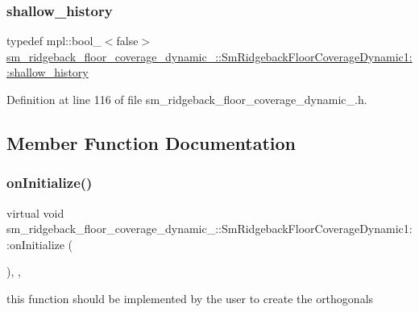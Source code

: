 \subsubsection{\texorpdfstring{shallow\+\_\+history}{shallow\_history}}
{\footnotesize\ttfamily typedef mpl\+::bool\+\_\+$<$false$>$ \hyperlink{structsm__ridgeback__floor__coverage__dynamic__1_1_1SmRidgebackFloorCoverageDynamic1_aa128c6e2d51521e9355484d7b7c1c1e9}{sm\+\_\+ridgeback\+\_\+floor\+\_\+coverage\+\_\+dynamic\+\_\+::\+Sm\+Ridgeback\+Floor\+Coverage\+Dynamic1\+::shallow\+\_\+history}}



Definition at line 116 of file sm\+\_\+ridgeback\+\_\+floor\+\_\+coverage\+\_\+dynamic\+\_.\+h.



\subsection{Member Function Documentation}
\mbox{\label{structsm__ridgeback__floor__coverage__dynamic__1_1_1SmRidgebackFloorCoverageDynamic1_ae23fc2975914c6d54c4dd14020a190a4}} 
\subsubsection{\texorpdfstring{on\+Initialize()}{onInitialize()}}
{\footnotesize\ttfamily virtual void sm\+\_\+ridgeback\+\_\+floor\+\_\+coverage\+\_\+dynamic\+\_\+::\+Sm\+Ridgeback\+Floor\+Coverage\+Dynamic1\+::on\+Initialize (\begin{DoxyParamCaption}{ }\end{DoxyParamCaption})\hspace{0.3cm}{\ttfamily [inline]}, {\ttfamily [override]}, {\ttfamily [virtual]}}



this function should be implemented by the user to create the orthogonals 



